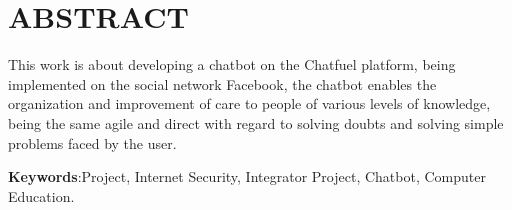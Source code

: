 \noindent\chapter*{\uppercase{Abstract}}

This work is about developing a chatbot on the Chatfuel platform, being implemented on the social network Facebook, the chatbot enables the organization and improvement of care to people of various levels of knowledge, being the same agile and direct with regard to solving doubts and solving simple problems faced by the user.

\vspace{1cm}

\noindent \textbf{Keywords}:Project, Internet Security, Integrator Project, Chatbot, Computer Education.